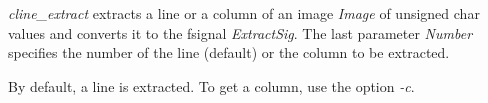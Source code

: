{\em cline\_extract} extracts a line or a column of an image {\em Image} of
unsigned char values and 
converts it to the fsignal {\em ExtractSig}. 
The last parameter {\em Number} specifies the number of the line (default) or 
the column to be extracted.

By default, a line is extracted. To get a column, use the option {\em -c}.
